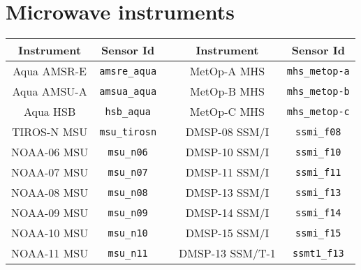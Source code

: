 \section{Microwave instruments}
\label{sec:microwave_instruments_sensor_id}

\begin{table}[htp]
  \centering
  \begin{tabular}{c c c c c}
    \hline
    \sffamily\textbf{Instrument} & \sffamily\textbf{Sensor Id} & \hspace{0.2cm} & \sffamily\textbf{Instrument} & \sffamily\textbf{Sensor Id} \\
    \hline\hline
Aqua AMSR-E     & \texttt{amsre\_aqua}    & \hspace{0.2cm} & MetOp-A MHS      & \texttt{mhs\_metop-a}      \\
Aqua AMSU-A     & \texttt{amsua\_aqua}    & \hspace{0.2cm} & MetOp-B MHS      & \texttt{mhs\_metop-b}      \\
Aqua HSB        & \texttt{hsb\_aqua}      & \hspace{0.2cm} & MetOp-C MHS      & \texttt{mhs\_metop-c}      \\
TIROS-N MSU     & \texttt{msu\_tirosn}    & \hspace{0.2cm} & DMSP-08 SSM/I    & \texttt{ssmi\_f08}         \\
NOAA-06 MSU     & \texttt{msu\_n06}       & \hspace{0.2cm} & DMSP-10 SSM/I    & \texttt{ssmi\_f10}         \\
NOAA-07 MSU     & \texttt{msu\_n07}       & \hspace{0.2cm} & DMSP-11 SSM/I    & \texttt{ssmi\_f11}         \\
NOAA-08 MSU     & \texttt{msu\_n08}       & \hspace{0.2cm} & DMSP-13 SSM/I    & \texttt{ssmi\_f13}         \\
NOAA-09 MSU     & \texttt{msu\_n09}       & \hspace{0.2cm} & DMSP-14 SSM/I    & \texttt{ssmi\_f14}         \\
NOAA-10 MSU     & \texttt{msu\_n10}       & \hspace{0.2cm} & DMSP-15 SSM/I    & \texttt{ssmi\_f15}         \\
NOAA-11 MSU     & \texttt{msu\_n11}       & \hspace{0.2cm} & DMSP-13 SSM/T-1  & \texttt{ssmt1\_f13}        \\

\end{tabular}
\end{table}
